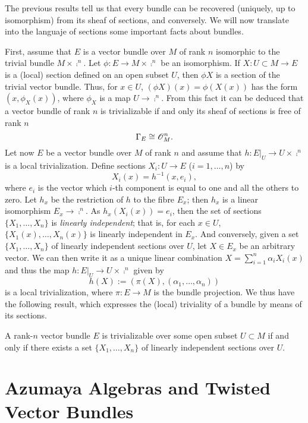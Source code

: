 The previous results tell us that every bundle can be recovered (uniquely, up to isomorphism) from its sheaf of sections, and conversely. We will now translate into the languaje of sections some important facts about bundles.

First, assume that $E$ is a vector bundle over $M$ of rank $n$ isomorphic to the trivial bundle $M\times \comp^n$. Let $\phi :E\to M\times \comp^n$ be an isomorphism. If $X:U\subset M\to E$ is a (local) section defined on an open subset $U$, then $\phi X$ is a section of the trivial vector bundle. Thus, for $x\in U$, $(\phi X)(x)=\phi (X(x))$ has the form $(x,\phi_X(x))$, where $\phi_X$ is a map $U\to \comp^n$. From this fact it can be deduced that a vector bundle of rank $n$ is trivializable if and only its sheaf of sections is free of rank $n$
$$\Gamma_E\cong \mathscr{O}^n_M.$$
Let now $E$ be a vector bundle over $M$ of rank $n$ and assume that $h:E|_U\to U\times \comp^n$ is a local trivialization. Define sections $X_i:U\to E$ ($i=1,\dots ,n$) by
$$X_i(x)=h^{-1}(x,e_i),$$
where $e_i$ is the vector which $i$-th component is equal to one and all the others to zero. Let $h_x$ be the restriction of $h$ to the fibre $E_x$; then $h_x$ is a linear isomorphism $E_x\to \comp^n$. As $h_x(X_i(x))=e_i$, then the set of sections $\{X_1,\dots ,X_n\}$ is \emph{linearly independent}; that is, for each $x\in U$, $\{X_1(x),\dots ,X_n(x)\}$ is linearly independent in $E_x$. And conversely, given a set $\{X_1,\dots ,X_n\}$ of linearly independent sections  over $U$, let $X\in E_x$ be an arbitrary vector. We can then write it as a unique linear combination $X=\sum_{i=1}^n\alpha_iX_i(x)$ and thus the map $h:E|_U\to U\times \comp^n$ given by
$$h(X):=(\pi (X),(\alpha_1,\dots ,\alpha_n))$$
is a local trivialization, where $\pi :E\to M$ is the bundle projection. We thus have the following result, which expresses the (local) triviality of a bundle by means of its sections.

\begin{proposition}
A rank-$n$ vector bundle $E$ is trivializable over some open subset $U\subset M$ if and only if there exists a set $\{X_1,\dots ,X_n\}$ of linearly independent sections over $U$.
\end{proposition}



\section{Azumaya Algebras and Twisted Vector Bundles}

